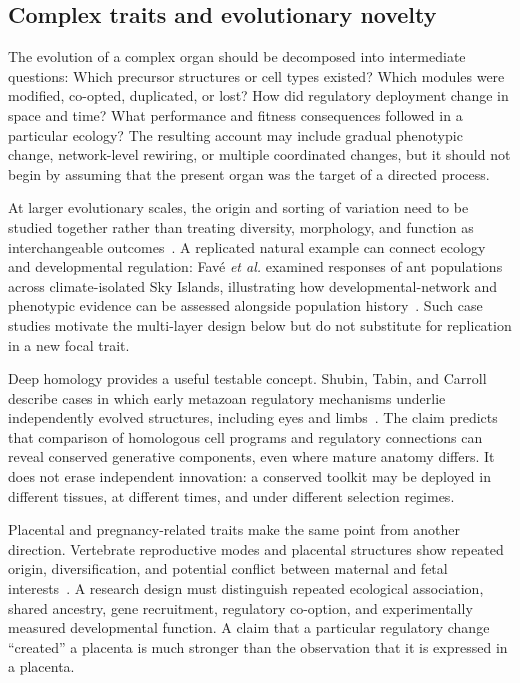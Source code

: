 \documentclass[conference]{IEEEtran}
\begin{document}
\subsection{Complex traits and evolutionary novelty}

The evolution of a complex organ should be decomposed into intermediate questions: Which precursor structures or cell types existed? Which modules were modified, co-opted, duplicated, or lost? How did regulatory deployment change in space and time? What performance and fitness consequences followed in a particular ecology? The resulting account may include gradual phenotypic change, network-level rewiring, or multiple coordinated changes, but it should not begin by assuming that the present organ was the target of a directed process.

At larger evolutionary scales, the origin and sorting of variation need to be studied together rather than treating diversity, morphology, and function as interchangeable outcomes~\cite{jablonski2017}. A replicated natural example can connect ecology and developmental regulation: Favé \emph{et al.} examined responses of ant populations across climate-isolated Sky Islands, illustrating how developmental-network and phenotypic evidence can be assessed alongside population history~\cite{fave2015}. Such case studies motivate the multi-layer design below but do not substitute for replication in a new focal trait.

Deep homology provides a useful testable concept. Shubin, Tabin, and Carroll describe cases in which early metazoan regulatory mechanisms underlie independently evolved structures, including eyes and limbs~\cite{shubin2009}. The claim predicts that comparison of homologous cell programs and regulatory connections can reveal conserved generative components, even where mature anatomy differs. It does not erase independent innovation: a conserved toolkit may be deployed in different tissues, at different times, and under different selection regimes.

Placental and pregnancy-related traits make the same point from another direction. Vertebrate reproductive modes and placental structures show repeated origin, diversification, and potential conflict between maternal and fetal interests~\cite{crespsemen2004}. A research design must distinguish repeated ecological association, shared ancestry, gene recruitment, regulatory co-option, and experimentally measured developmental function. A claim that a particular regulatory change ``created'' a placenta is much stronger than the observation that it is expressed in a placenta.
\end{document}
